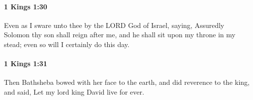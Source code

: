 		\paragraph{1 Kings 1:30} %
			\label{1KINGS-1-30}

			Even as I sware unto thee by the LORD God of Israel, saying, Assuredly Solomon thy son shall reign after me, and he shall sit upon my throne in my stead; even so will I certainly do this day.


		\paragraph{1 Kings 1:31} %
			\label{1KINGS-1-31}

			Then Bathsheba bowed with her face to the earth, and did reverence to the king, and said, Let my lord king David live for ever.


